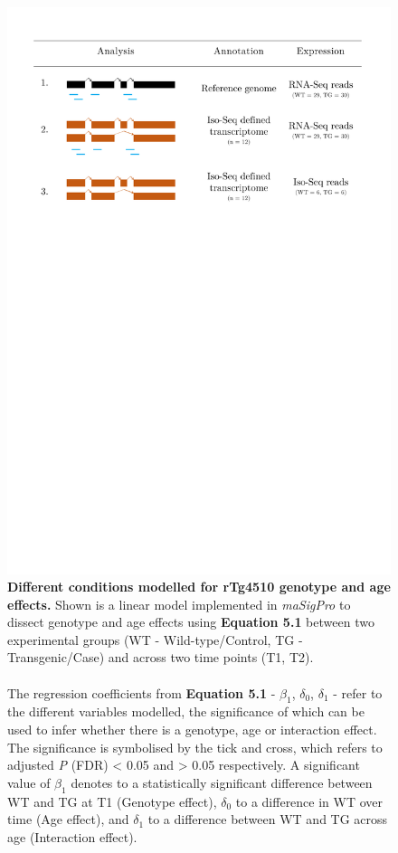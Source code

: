 \begin{figure}[!htp]
	\centering
	\includegraphics[page=2,trim={0 5cm 0 4cm},scale = 0.45]{Figures/Tg4510_diff_figures.pdf}
	\captionsetup{width=0.95\textwidth}
	\caption[Different conditions modelled for rTg4510 genotype and age effects]%
	{\textbf{Different conditions modelled for rTg4510 genotype and age effects.} Shown is a linear model implemented in \textit{maSigPro} to dissect genotype and age effects using \textbf{Equation 5.1} between two experimental groups (WT - Wild-type/Control, TG - Transgenic/Case) and across two time points (T1, T2). 
	\\\\
	The regression coefficients from \textbf{Equation 5.1} - $\beta_{1}$, $\delta_{0}$, $\delta_{1}$ - refer to the different variables modelled, the significance of which can be used to infer whether there is a genotype, age or interaction effect. The significance is symbolised by the tick and cross, which refers to adjusted \textit{P} (FDR) < 0.05 and > 0.05 respectively. A significant value of $\beta_{1}$ denotes to a statistically significant difference between WT and TG at T1 (Genotype effect), $\delta_{0}$ to a difference in WT over time (Age effect), and $\delta_{1}$ to a difference between WT and TG across age (Interaction effect).}   
	\label{fig:dea_model}
\end{figure}

